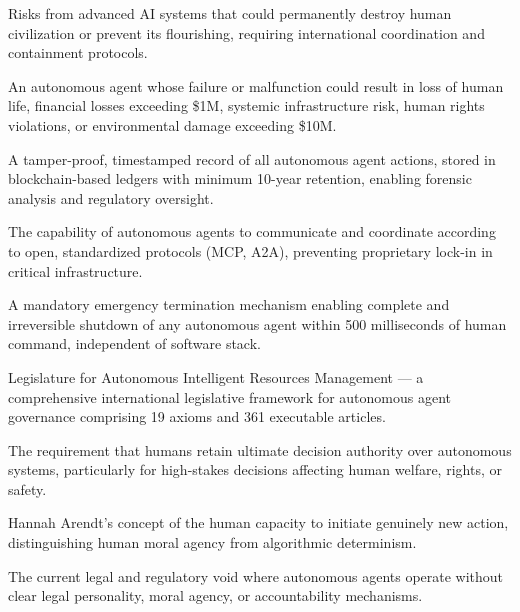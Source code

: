 \begin{description}[style=nextline,labelwidth=3cm]
\item[\textbf{Existential Risk}]
Risks from advanced AI systems that could permanently destroy human civilization or prevent its flourishing, requiring international coordination and containment protocols.

\item[\textbf{High-Risk Autonomous System}]
An autonomous agent whose failure or malfunction could result in loss of human life, financial losses exceeding \$1M, systemic infrastructure risk, human rights violations, or environmental damage exceeding \$10M.

\item[\textbf{Immutable Audit Trail}]
A tamper-proof, timestamped record of all autonomous agent actions, stored in blockchain-based ledgers with minimum 10-year retention, enabling forensic analysis and regulatory oversight.

\item[\textbf{Interoperability}]
The capability of autonomous agents to communicate and coordinate according to open, standardized protocols (MCP, A2A), preventing proprietary lock-in in critical infrastructure.

\item[\textbf{Kill-Switch}]
A mandatory emergency termination mechanism enabling complete and irreversible shutdown of any autonomous agent within 500 milliseconds of human command, independent of software stack.

\item[\textbf{LAIRM}]
Legislature for Autonomous Intelligent Resources Management — a comprehensive international legislative framework for autonomous agent governance comprising 19 axioms and 361 executable articles.

\item[\textbf{Meaningful Human Control}]
The requirement that humans retain ultimate decision authority over autonomous systems, particularly for high-stakes decisions affecting human welfare, rights, or safety.

\item[\textbf{Natality}]
Hannah Arendt's concept of the human capacity to initiate genuinely new action, distinguishing human moral agency from algorithmic determinism.

\item[\textbf{Normative Vacuum}]
The current legal and regulatory void where autonomous agents operate without clear legal personality, moral agency, or accountability mechanisms.


\end{description}
